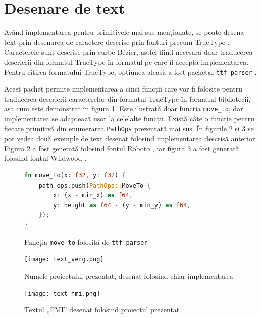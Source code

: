 \documentclass[a4paper, 12pt]{report}
\begin{document}
\section{Desenare de text}

Având implementarea pentru primitivele mai sus menționate, se poate desena text prin desenarea de caractere descrise prin
fonturi precum TrueType \cite{TrueType}. Caracterele sunt descrise prin curbe Bézier, astfel fiind necesară doar traducerea
descrierii din formatul TrueType în formatul pe care îl acceptă implementarea. Pentru citirea formatului TrueType, opțiunea aleasă
a fost pachetul \texttt{ttf\_parser} \cite{TrueTypeParser}.

Acest pachet permite implementarea a cinci funcții care vor fi folosite pentru
traducerea descrierii caracterelor din formatul TrueType în formatul bibliotecii, așa cum este demonstrat în figura
\ref{fig-ttf-parser-demo}. Este ilustrată doar funcția \texttt{move\_to}, dar implementarea se adaptează ușor la celelalte funcții.
Există câte o funcție pentru fiecare primitivă din enumerarea \texttt{PathOps} prezentată mai sus. În figurile
\ref{fig-text-verg} și \ref{fig-text-fmi} se pot vedea două exemple de text desenat folosind implementarea descrisă anterior. Figura
\ref{fig-text-verg} a fost generată folosind fontul Roboto \cite{Roboto}, iar figura \ref{fig-text-fmi} a fost generată
folosind fontul Wildwood \cite{Wildwood}.

\begin{figure}[ht]
    \centering
    \begin{lstlisting}[language=Rust]
fn move_to(x: f32, y: f32) {
    path_ops.push(PathOps::MoveTo {
        x: (x - min_x) as f64,
        y: height as f64 - (y - min_y) as f64,
    });
}
    \end{lstlisting}
    \caption{Funcția \texttt{move\_to} folosită de \texttt{ttf\_parser}}
    \label{fig-ttf-parser-demo}
\end{figure}

\begin{figure}[ht]
    \texttt{[image: text\_verg.png]}
    \centering
    \caption{Numele proiectului prezentat, desenat folosind chiar implementarea}
    \label{fig-text-verg}
\end{figure}

\begin{figure}[ht]
    \texttt{[image: text\_fmi.png]}
    \centering
    \caption{Textul „FMI” desenat folosind proiectul prezentat}
    \label{fig-text-fmi}
\end{figure}
\end{document}
